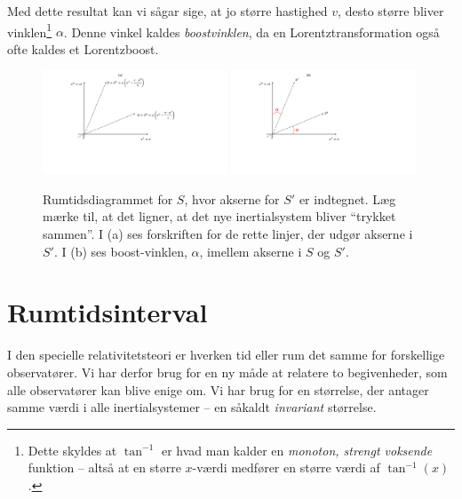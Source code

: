 \documentclass[crop=false, class=memoir]{standalone}
\begin{document}
%
Med dette resultat kan vi sågar sige, at jo større hastighed $v$, desto større bliver vinklen\footnote{Dette skyldes at $\tan^{-1}$ er hvad man kalder en \emph{monoton, strengt voksende} funktion -- altså at en større $x$-værdi medfører en større værdi af $\tan^{-1}(x)$.} $\alpha$. Denne vinkel kaldes \emph{boostvinklen}, da en Lorentztransformation også ofte kaldes et Lorentzboost.
%
\begin{figure}[]
    \centering
    \includegraphics[trim = 100 150 200 0, clip, width =  0.49\textwidth]{Rel/Billeder/LorentzTransform.pdf}
    \includegraphics[trim = 100 150 200 0, clip, width = 0.49\textwidth]{Rel/Billeder/BoostAngle.pdf}
    \caption{Rumtidsdiagrammet for $S$, hvor akserne for $S'$ er indtegnet. Læg mærke til, at det ligner, at det nye inertialsystem bliver ``trykket sammen''. I (a) ses forskriften for de rette linjer, der udgør akserne i $S'$. I (b) ses boost-vinklen, $\alpha$, imellem akserne i $S$ og $S'$.}
    \label{rel:fig:TransDia}
\end{figure}



\section{Rumtidsinterval}








I den specielle relativitetsteori er hverken tid eller rum det samme for forskellige observatører.
Vi har derfor brug for en ny måde at relatere to begivenheder, som alle observatører kan blive enige om.
Vi har brug for en størrelse, der antager samme værdi i alle inertialsystemer -- en såkaldt \emph{invariant} størrelse.
\end{document}
